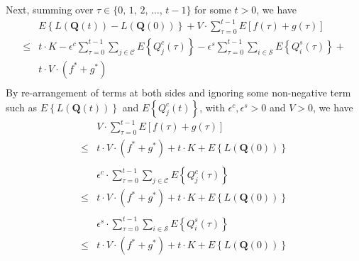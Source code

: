 \documentclass[10pt,journal,compsoc]{IEEEtran}
\begin{document}
Next, summing over $\tau \in \{0,\,1,\,2,\,\dots,\,t-1\}$ for some $t > 0$, we have
\begin{equation}
	\begin{array}{cl}
		& \displaystyle E \left\{ L\left(\mathbf{Q}(t) \right) - L\left(\mathbf{Q}(0) \right) \right\} + V  \cdot \sum_{\tau = 0}^{t-1} E\left[ f(\tau) + g(\tau) \right] \\
		\le & \displaystyle t \cdot K 
		- \epsilon^c \sum_{\tau = 0}^{t-1} \sum_{j \in \mathcal{C}} E\left\{Q_j^c(\tau)\right\} 
		- \epsilon^s \sum_{\tau = 0}^{t-1} \sum_{i \in \mathcal{S}} E\left\{Q_i^s(\tau)\right\} + \\
		& t \cdot V \cdot (f^* + g^*) \\		
	\end{array}
\end{equation}
By re-arrangement of terms at both sides and ignoring some non-negative term such as $E\left\{ L\left(\mathbf{Q}(t)\right) \right\}$ and $E\left\{ Q^c_j(t) \right\}$, with $\epsilon^c, \epsilon^s > 0$ and $V > 0$, we have
\begin{equation}\label{vfg}
	\begin{array}{cl}
		& \displaystyle V \cdot \sum_{\tau = 0}^{t-1} E\left[ f(\tau) + g(\tau) \right] \\
		\le & t \cdot V \cdot (f^* + g^*) + t \cdot K + E\left\{ L(\mathbf{Q}(0)) \right\} \\
	\end{array}
\end{equation}
\begin{equation}\label{ecq}
	\begin{array}{cl}
		& \displaystyle \epsilon^c \cdot \sum_{\tau = 0}^{t-1} \sum_{j \in \mathcal{C}} E\left\{Q_j^c(\tau)\right\} \\
		\le & t \cdot V \cdot (f^* + g^*) + t \cdot K + E\left\{ L(\mathbf{Q}(0)) \right\} \\
	\end{array}
\end{equation}
\begin{equation}\label{esq}
	\begin{array}{cl}
		& \displaystyle \epsilon^s \cdot \sum_{\tau = 0}^{t-1} \sum_{i \in \mathcal{S}} E\left\{Q_i^s(\tau)\right\} \\
		\le & t \cdot V \cdot (f^* + g^*) + t \cdot K + E\left\{ L(\mathbf{Q}(0)) \right\} \\
	\end{array}
\end{equation}
\end{document}
